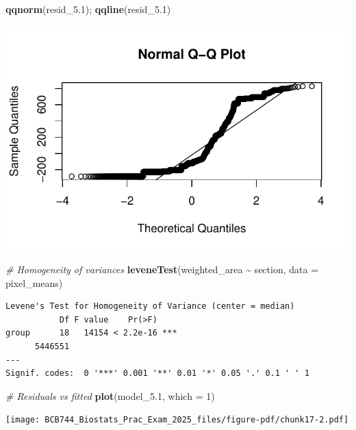 \documentclass[
  british,
  10pt,
]{article}
\newenvironment{Shaded}{\begin{snugshade}}{\end{snugshade}}
\newcommand{\AttributeTok}[1]{\textcolor[rgb]{0.13,0.29,0.53}{#1}}
\newcommand{\CommentTok}[1]{\textcolor[rgb]{0.56,0.35,0.01}{\textit{#1}}}
\newcommand{\DecValTok}[1]{\textcolor[rgb]{0.00,0.00,0.81}{#1}}
\newcommand{\FloatTok}[1]{\textcolor[rgb]{0.00,0.00,0.81}{#1}}
\newcommand{\FunctionTok}[1]{\textcolor[rgb]{0.13,0.29,0.53}{\textbf{#1}}}
\newcommand{\NormalTok}[1]{#1}
\newcommand{\SpecialCharTok}[1]{\textcolor[rgb]{0.81,0.36,0.00}{\textbf{#1}}}
\let\oldtexttt\texttt
\renewcommand{\texttt}[1]{\oldtexttt{\small #1}}
\begin{document}
\begin{Shaded}
\begin{Highlighting}[]
\FunctionTok{qqnorm}\NormalTok{(resid\_5}\FloatTok{.1}\NormalTok{); }\FunctionTok{qqline}\NormalTok{(resid\_5}\FloatTok{.1}\NormalTok{)}
\end{Highlighting}
\end{Shaded}

\begin{center}
\includegraphics[width=0.6\linewidth,height=\textheight,keepaspectratio]{BCB744_Biostats_Prac_Exam_2025_files/figure-pdf/chunk17-1.pdf}
\end{center}

\begin{Shaded}
\begin{Highlighting}[]
\CommentTok{\# Homogeneity of variances}
\FunctionTok{leveneTest}\NormalTok{(weighted\_area }\SpecialCharTok{\textasciitilde{}}\NormalTok{ section, }\AttributeTok{data =}\NormalTok{ pixel\_means)}
\end{Highlighting}
\end{Shaded}

\begin{verbatim}
Levene's Test for Homogeneity of Variance (center = median)
           Df F value    Pr(>F)    
group      18   14154 < 2.2e-16 ***
      5446551                      
---
Signif. codes:  0 '***' 0.001 '**' 0.01 '*' 0.05 '.' 0.1 ' ' 1
\end{verbatim}

\begin{Shaded}
\begin{Highlighting}[]
\CommentTok{\# Residuals vs fitted}
\FunctionTok{plot}\NormalTok{(model\_5}\FloatTok{.1}\NormalTok{, }\AttributeTok{which =} \DecValTok{1}\NormalTok{)}
\end{Highlighting}
\end{Shaded}

\begin{center}
\texttt{[image: BCB744\_Biostats\_Prac\_Exam\_2025\_files/figure-pdf/chunk17-2.pdf]}
\end{center}
\end{document}
